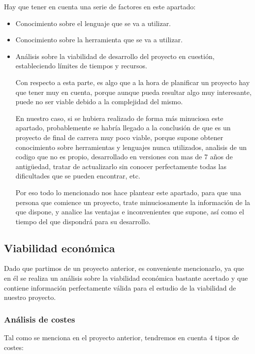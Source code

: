 Hay que tener en cuenta una serie de factores en este apartado:

\begin{itemize}

\item Conocimiento sobre el lenguaje que se va a utilizar.
\item Conocimiento sobre la herramienta que se va a utilizar.
\item Análisis sobre la viabilidad de desarrollo del proyecto en cuestión, estableciendo límites de tiempos y recursos.
	
	Con respecto a esta parte, es algo que a la hora de planificar un proyecto hay que tener muy en cuenta, porque aunque pueda resultar algo muy interesante, puede no ser viable debido a la complejidad del mismo.
	
	En nuestro caso, si se hubiera realizado de forma más minuciosa este apartado, probablemente se habría llegado a la conclusión de que es un proyecto de final de carrera muy poco viable, porque supone obtener conocimiento sobre herramientas y lenguajes nunca utilizados, analisis de un codigo que no es propio, desarrollado en versiones con mas de 7 años de antigüedad, tratar de actualizarlo sin conocer perfectamente todas las dificultades que se pueden encontrar, etc.
	
	Por eso todo lo mencionado nos hace plantear este apartado, para que una persona que comience un proyecto, trate minuciosamente la información de la que dispone, y analice las ventajas e inconvenientes que supone, así como el tiempo del que dispondrá para su desarrollo.

\end{itemize}



\subsection{Viabilidad económica}

Dado que partimos de un proyecto anterior, es conveniente mencionarlo, ya que en él se realiza un análisis sobre la viabilidad económica bastante acertado y que contiene información perfectamente válida para el estudio de la viabilidad de nuestro proyecto.

\subsubsection{Análisis de costes}

Tal como se menciona en el proyecto anterior, tendremos en cuenta 4 tipos de costes:

